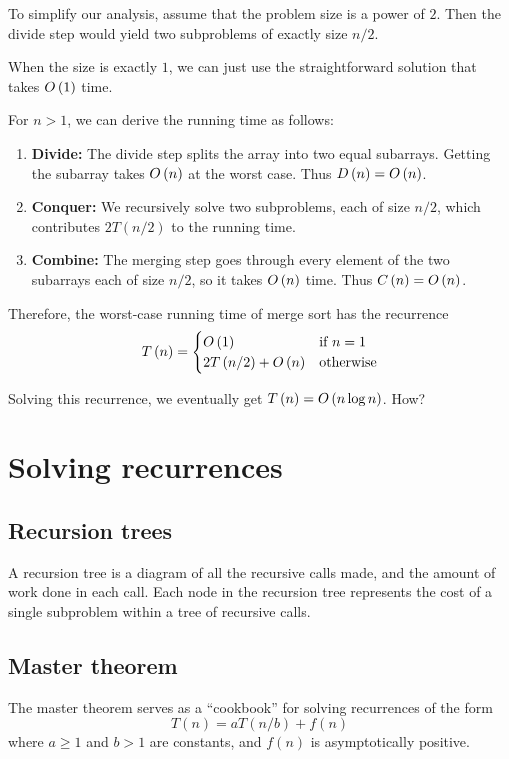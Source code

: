 \begin{example}
To simplify our analysis, assume that the problem size is a power of $2$. Then the divide step would yield two subproblems of exactly size $n/2$.

When the size is exactly $1$, we can just use the straightforward solution that takes $O\left(1 \right)$ time.

For $n > 1$, we can derive the running time as follows:
\begin{enumerate}
    \item \textbf{Divide:} The divide step splits the array into two equal subarrays. Getting the subarray takes $O\left(n \right)$ at the worst case. Thus $D\left(n\right) = O\left(n \right)$.
    \item \textbf{Conquer:} We recursively solve two subproblems, each of size $n/2$, which contributes $2T(n/2)$ to the running time.
    \item \textbf{Combine:} The merging step goes through every element of the two subarrays each of size $n/2$, so it takes $O\left(n \right)$ time. Thus $C\left(n\right) = O\left(n \right)$.
\end{enumerate}

Therefore, the worst-case running time of merge sort has the recurrence
\[
T\left(n\right) = \begin{cases}
    O\left(1 \right) & \text{if $n = 1$}\\
    2 T\left(n/2\right) + O\left(n \right) & \text{otherwise}
\end{cases}
\]

Solving this recurrence, we eventually get $T\left(n\right) = O\left(n \log n \right)$. How?
\end{example}

\section{Solving recurrences}

\subsection{Recursion trees}
A recursion tree is a diagram of all the recursive calls made, and the amount of work done in each call. Each node in the recursion tree represents the cost of a single subproblem within a tree of recursive calls.

\subsection{Master theorem}
The master theorem serves as a ``cookbook'' for solving recurrences of the form
\[
T\left(n\right) = aT\left(n/b\right) + f\left(n\right)
\]
where $a \ge 1$ and $b>1$ are constants, and $f\left(n\right)$ is asymptotically positive.

